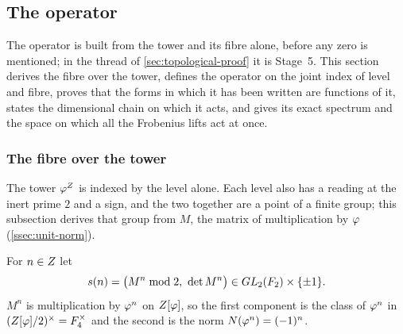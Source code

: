 \subsection{The operator}\label{sec:operator}

The operator is built from the tower and its fibre alone, before any zero is mentioned; in the thread of \cref{sec:topological-proof} it is Stage~5.  This section derives the fibre over the tower,
defines the operator on the joint index of level and fibre, proves that the forms in which it has been written are
functions of it, states the dimensional chain on which it acts, and gives its exact spectrum and the space on which
all the Frobenius lifts act at once.

\subsubsection{The fibre over the tower}\label{ssec:fibre}

The tower $\varphi^{Z}$ is indexed by the level alone.  Each level also has a reading at the inert prime $2$ and a
sign, and the two together are a point of a finite group; this subsection derives that group from $M$, the matrix of
multiplication by $\varphi$ (\cref{ssec:unit-norm}).

\begin{definition}\label{def:signature}
For $n\in Z$ let
\[
  s(n)=\bigl(M^n\bmod 2,\ \det M^n\bigr)\in GL_2(F_2)\times\{\pm1\}.
\]
$M^n$ is multiplication by $\varphi^n$ on $Z[\varphi]$, so the first component is the class of $\varphi^n$ in
$(Z[\varphi]/2)^\times=F_4^\times$ and the second is the norm $N(\varphi^n)=(-1)^n$.
\end{definition}

